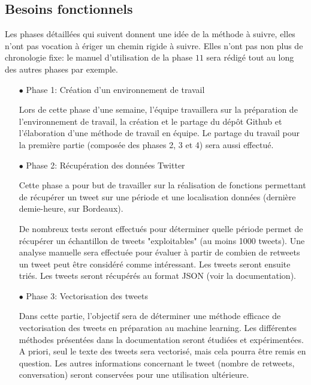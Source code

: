 \documentclass{article}
\begin{document}
\subsection{Besoins fonctionnels}

Les phases détaillées qui suivent donnent une idée de la méthode à suivre, elles n'ont pas vocation à ériger un chemin rigide à suivre. 
Elles n'ont pas non plus de chronologie fixe: le manuel d'utilisation de la phase $11$ sera rédigé tout au long des autres phases par exemple. \\

\begin{itemize}
\item[$\bullet$]\color{red} Phase 1: Création d'un environnement de travail         \color{black}

Lors de cette phase d'une semaine, l'équipe travaillera sur la préparation de l'environnement de travail, la création et le partage du dépôt Github et l'élaboration d'une méthode de travail en équipe. 
Le partage du travail pour la première partie (composée des phases 2, 3 et 4) sera aussi effectué. \\

\item[$\bullet$] \color{red}Phase 2: Récupération des données Twitter \color{black}

Cette phase a pour but de travailler sur la réalisation de fonctions permettant de récupérer un tweet sur une période et une localisation données (dernière demie-heure, sur Bordeaux). 

De nombreux tests seront effectués pour déterminer quelle période permet de récupérer un échantillon de tweets "exploitables" (au moins 1000 tweets).
Une analyse manuelle sera effectuée pour évaluer à partir de combien de retweets un tweet peut être considéré comme intéressant. Les tweets seront ensuite triés.
Les tweets seront récupérés au format JSON (voir la documentation). \\

\item[$\bullet$] \color{red}Phase 3: Vectorisation des tweets \color{black}

Dans cette partie, l'objectif sera de déterminer une méthode efficace de vectorisation des tweets en préparation au machine learning. 
Les différentes méthodes présentées dans la documentation seront étudiées et expérimentées. 
A priori, seul le texte des tweets sera vectorisé, mais cela pourra être remis en question. 
Les autres informations concernant le tweet (nombre de retweets, conversation) seront conservées pour une utilisation ultérieure. \\


\end{itemize}
\end{document}
